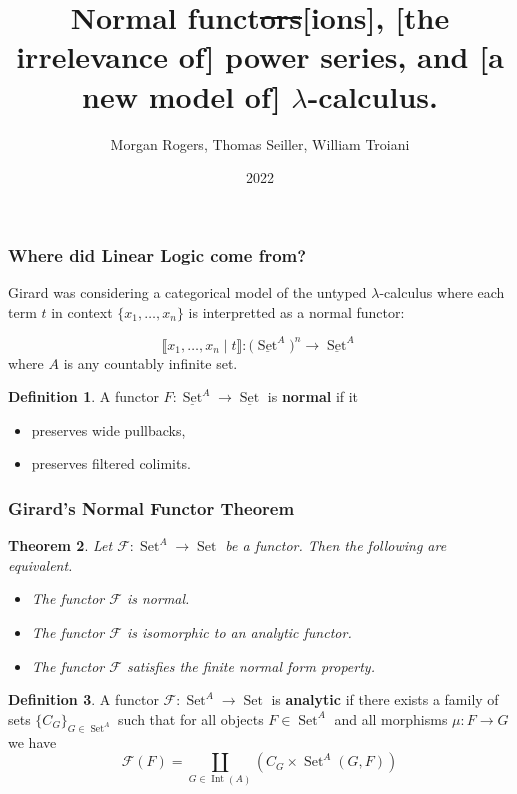 \documentclass{beamer}
\title{Normal funct\sout{ors}[ions], [the irrelevance of] power series, and [a new model of] $\lambda$-calculus.}
\author{Morgan Rogers, Thomas Seiller, William Troiani}
\institute{University of Sorbonne Paris Nord, University of Melbourne}
\date{2022}
\theoremstyle{plain}
\newtheorem{thm}{Theorem}[subsection] %
\theoremstyle{definition}
\newtheorem{defn}[thm]{Definition} %
\newcommand{\scr}[1]{\mathscr{#1}}
\newcommand{\lto}{\longrightarrow}
\DeclareMathOperator{\set}{Set}
\begin{document}
	
	\frame{\titlepage}
	
	\begin{frame}
	\frametitle{Where did Linear Logic come from?}
	Girard was considering a categorical model of the untyped $\lambda$-calculus where each term $t$ in context $\{ x_1, \ldots, x_n \}$ is interpretted as a normal functor:

	\begin{equation*}
	\llbracket x_1, \ldots, x_n \mid t \rrbracket: \big(\underline{\operatorname{Set}}^{A}\big)^n \lto \underline{\operatorname{Set}}^{A}
	\end{equation*}
	where $A$ is any countably infinite set.

\begin{defn}
A functor $F: \underline{\operatorname{Set}}^A \lto \underline{\operatorname{Set}}$ is \textbf{normal} if it
\begin{itemize}
	\item preserves wide pullbacks,
	\item preserves filtered colimits.
\end{itemize}
\end{defn}
	\end{frame}
	\begin{frame}
	\frametitle{Girard's Normal Functor Theorem}
	\begin{thm}\label{thm:normal_form_theorem}
    Let $\scr{F}: \set^A \lto \set$ be a functor. Then the following are equivalent.
    \begin{itemize}
        \item The functor $\scr{F}$ is normal.
        \item The functor $\scr{F}$ is isomorphic to an analytic functor.
        \item The functor $\scr{F}$ satisfies the finite normal form property.
    \end{itemize}
\end{thm}
\begin{defn}\label{def:analytic}
		A functor $\scr{F}: \set^A \lto \set$ is \textbf{analytic} if there exists a family of sets $\lbrace C_{G}\rbrace_{G \in \set^A}$ such that for all objects $F \in \set^A$ and all morphisms $\mu: F \lto G$ we have
		\begin{equation*}
			\scr{F}(F) = \coprod_{G \in \operatorname{Int}(A) }( C_G\times \set^A(G,F))
			\end{equation*}
		\end{defn}
	\end{frame}
\end{document}
